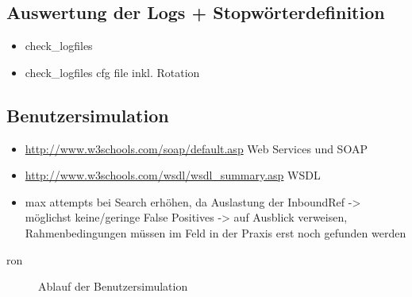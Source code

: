 \subsection{Auswertung der Logs + Stopwörterdefinition}
\begin{itemize}
\item check\_logfiles
\item check\_logfiles cfg file inkl. Rotation
\end{itemize}

\subsection{Benutzersimulation}





\begin{itemize}
\item \url{http://www.w3schools.com/soap/default.asp} Web Services und SOAP
\item \url{http://www.w3schools.com/wsdl/wsdl_summary.asp} WSDL
\item max attempts bei Search erhöhen, da Auslastung der InboundRef -> möglichst keine/geringe False Positives -> auf Ausblick verweisen, Rahmenbedingungen müssen im Feld in der Praxis erst noch gefunden werden
\end{itemize}ron

\begin{figure}[ht]
	\centering
		\caption{Ablauf der Benutzersimulation}
		\label{usersim}
\end{figure}

